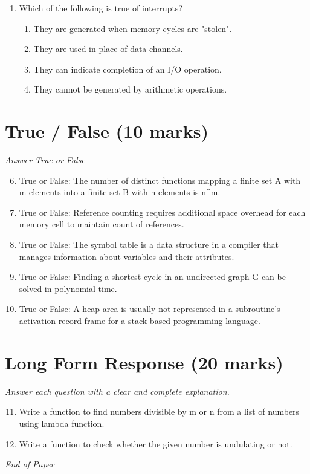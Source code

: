 \documentclass[12pt]{article}
\begin{document}
\begin{enumerate}[label=\arabic*.]
the purpose of the Address Resolution Protocol?
\begin{enumerate}[label=(\alph*)]
    \item To translate Web addresses to host names
    \item To determine the IP address of a given host name
    \item To determine the hardware address of a given host name
    \item To determine the hardware address of a given IP address
\end{enumerate}
\item Which of the following is true of interrupts?
\begin{enumerate}[label=(\alph*)]
    \item They are generated when memory cycles are "stolen".
    \item They are used in place of data channels.
    \item They can indicate completion of an I/O operation.
    \item They cannot be generated by arithmetic operations.
\end{enumerate}
\end{enumerate}

\section*{True / False (10 marks)}
\textit{Answer True or False}
\begin{enumerate}[label=\arabic*.]
\setcounter{enumi}{5}
\item True or False: The number of distinct functions mapping a finite set A with m elements into a finite set B with n elements is n\^{}m.
\item True or False: Reference counting requires additional space overhead for each memory cell to maintain count of references.
\item True or False: The symbol table is a data structure in a compiler that manages information about variables and their attributes.
\item True or False: Finding a shortest cycle in an undirected graph G can be solved in polynomial time.
\item True or False: A heap area is usually not represented in a subroutine's activation record frame for a stack-based programming language.
\end{enumerate}

\section*{Long Form Response (20 marks)}
\textit{Answer each question with a clear and complete explanation.}
\begin{enumerate}[label=\arabic*.]
\setcounter{enumi}{10}
\item Write a function to find numbers divisible by m or n from a list of numbers using lambda
function.
\item Write a function to check whether the given number is undulating or not.
\end{enumerate}

\vfill
\noindent\textit{End of Paper}
\end{document}
